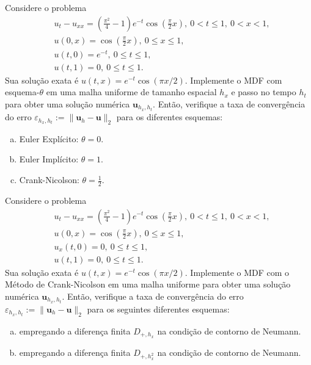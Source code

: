 \begin{exer}
  Considere o problema
  \begin{subequations}
    \begin{align}
      &u_t - u_{xx} = \left(\frac{\pi^2}{4} - 1\right)e^{-t}\cos\left(\frac{\pi}{2}x\right), ~0<t\leq 1, ~0<x<1,\\
      &u(0,x) = \cos\left(\frac{\pi}{2}x\right), ~0\leq x\leq 1,\\
      &u(t,0) = e^{-t}, ~0\leq t \leq 1,\\
      &u(t,1) = 0, ~0\leq t \leq 1.
    \end{align}
  \end{subequations}
  Sua solução exata é $u(t,x) = e^{-t}\cos(\pi x/2)$. Implemente o MDF com esquema-$\theta$ em uma malha uniforme de tamanho espacial $h_x$ e passo no tempo $h_t$ para obter uma solução numérica $\pmb{u}_{h_x, h_t}$. Então, verifique a taxa de convergência do erro $\varepsilon_{h_x, h_t} := \|\pmb{u}_h - \pmb{u}\|_2$ para os diferentes esquemas:
  \begin{enumerate}[a)]
  \item Euler Explícito: $\theta = 0$.
  \item Euler Implícito: $\theta = 1$.
  \item Crank-Nicolson: $\theta = \frac{1}{2}$.
  \end{enumerate}
\end{exer}

\begin{exer}
  Considere o problema
  \begin{subequations}
    \begin{align}
      &u_t - u_{xx} = \left(\frac{\pi^2}{4} - 1\right)e^{-t}\cos\left(\frac{\pi}{2}x\right), ~0<t\leq 1, ~0<x<1,\\
      &u(0,x) = \cos\left(\frac{\pi}{2}x\right), ~0\leq x\leq 1,\\
      &u_x(t,0) = 0, ~0\leq t \leq 1,\\
      &u(t,1) = 0, ~0\leq t \leq 1.
    \end{align}
  \end{subequations}
  Sua solução exata é $u(t,x) = e^{-t}\cos(\pi x/2)$. Implemente o MDF com o Método de Crank-Nicolson em uma malha uniforme para obter uma solução numérica $\pmb{u}_{h_x, h_t}$. Então, verifique a taxa de convergência do erro $\varepsilon_{h_x, h_t} := \|\pmb{u}_h - \pmb{u}\|_2$ para os seguintes diferentes esquemas:
  \begin{enumerate}[a)]
  \item empregando a diferença finita $D_{+,h_x}$ na condição de contorno de Neumann.
  \item empregando a diferença finita $D_{+,h_x^2}$ na condição de contorno de Neumann.
  \end{enumerate}
\end{exer}



